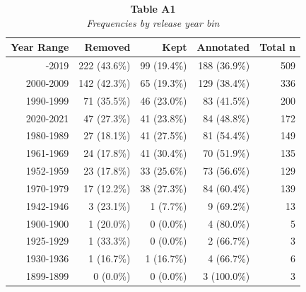 \begin{table}
\caption*{
{\large \textbf{Table A1}} \\ 
{\small \emph{Frequencies by release year bin}}
} 
\fontsize{12.0pt}{14.4pt}\selectfont
\begin{tabular*}{\linewidth}{@{\extracolsep{\fill}}rrrrr}
\toprule
{Year Range} & Removed & Kept & Annotated & Total n \\ 
\midrule\addlinespace[2.5pt]
2010-2019 & 222 (43.6\%) & 99 (19.4\%) & 188 (36.9\%) & 509 \\ 
2000-2009 & 142 (42.3\%) & 65 (19.3\%) & 129 (38.4\%) & 336 \\ 
1990-1999 & 71 (35.5\%) & 46 (23.0\%) & 83 (41.5\%) & 200 \\ 
2020-2021 & 47 (27.3\%) & 41 (23.8\%) & 84 (48.8\%) & 172 \\ 
1980-1989 & 27 (18.1\%) & 41 (27.5\%) & 81 (54.4\%) & 149 \\ 
1961-1969 & 24 (17.8\%) & 41 (30.4\%) & 70 (51.9\%) & 135 \\ 
1952-1959 & 23 (17.8\%) & 33 (25.6\%) & 73 (56.6\%) & 129 \\ 
1970-1979 & 17 (12.2\%) & 38 (27.3\%) & 84 (60.4\%) & 139 \\ 
1942-1946 & 3 (23.1\%) & 1 (7.7\%) & 9 (69.2\%) & 13 \\ 
1900-1900 & 1 (20.0\%) & 0 (0.0\%) & 4 (80.0\%) & 5 \\ 
1925-1929 & 1 (33.3\%) & 0 (0.0\%) & 2 (66.7\%) & 3 \\ 
1930-1936 & 1 (16.7\%) & 1 (16.7\%) & 4 (66.7\%) & 6 \\ 
1899-1899 & 0 (0.0\%) & 0 (0.0\%) & 3 (100.0\%) & 3 \\ 
\bottomrule
\end{tabular*}
\end{table}

